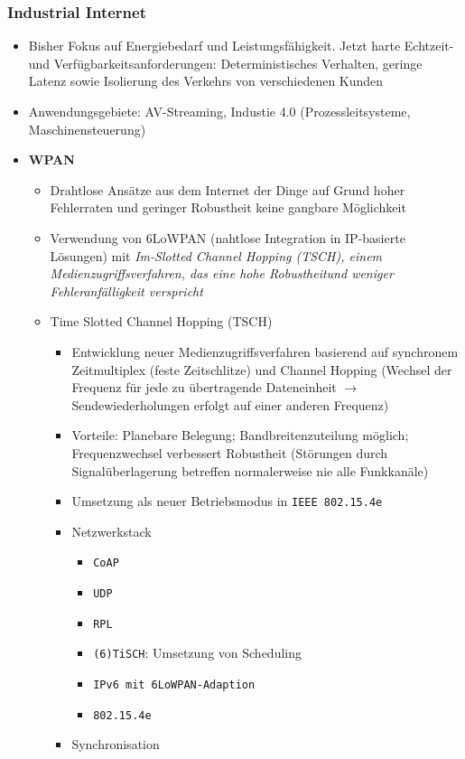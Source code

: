 \subsubsection{Industrial Internet}
\begin{itemize}
	\item Bisher Fokus auf Energiebedarf und Leistungsfähigkeit. Jetzt harte Echtzeit- und Verfügbarkeitsanforderungen: Deterministisches Verhalten, geringe Latenz sowie Isolierung des Verkehrs von verschiedenen Kunden
	\item Anwendungsgebiete: AV-Streaming, Industie 4.0 (Prozessleitsysteme, Maschinensteuerung)
	\item \textbf{WPAN}
	\begin{itemize}
		\item Drahtlose Ansätze aus dem Internet der Dinge auf Grund hoher Fehlerraten und geringer Robustheit keine gangbare Möglichkeit
		\item Verwendung von 6LoWPAN (nahtlose Integration in IP-basierte Lösungen) mit \textit{Im-Slotted Channel Hopping (TSCH), einem Medienzugriffsverfahren, das eine hohe Robustheitund weniger Fehleranfälligkeit verspricht}
		\item Time Slotted Channel Hopping (TSCH)
		\begin{itemize}
			\item Entwicklung neuer Medienzugriffsverfahren basierend auf synchronem Zeitmultiplex (feste Zeitschlitze) und Channel Hopping (Wechsel der Frequenz für jede zu übertragende Dateneinheit \(\rightarrow\) Sendewiederholungen erfolgt auf einer anderen Frequenz)
			\item Vorteile: Planebare Belegung; Bandbreitenzuteilung möglich; Frequenzwechsel verbessert Robustheit (Störungen durch Signalüberlagerung betreffen normalerweise nie alle Funkkanäle)
			\item Umsetzung als neuer Betriebsmodus in \texttt{IEEE 802.15.4e}
			\item Netzwerkstack
			\begin{itemize}
				\item \texttt{CoAP}
				\item \texttt{UDP}
				\item \texttt{RPL}
				\item \texttt{(6)TiSCH}: Umsetzung von Scheduling
				\item \texttt{IPv6 mit 6LoWPAN-Adaption}
				\item \texttt{802.15.4e}
			\end{itemize}
			\item Synchronisation

\end{itemize}
\end{itemize}
\end{itemize}
